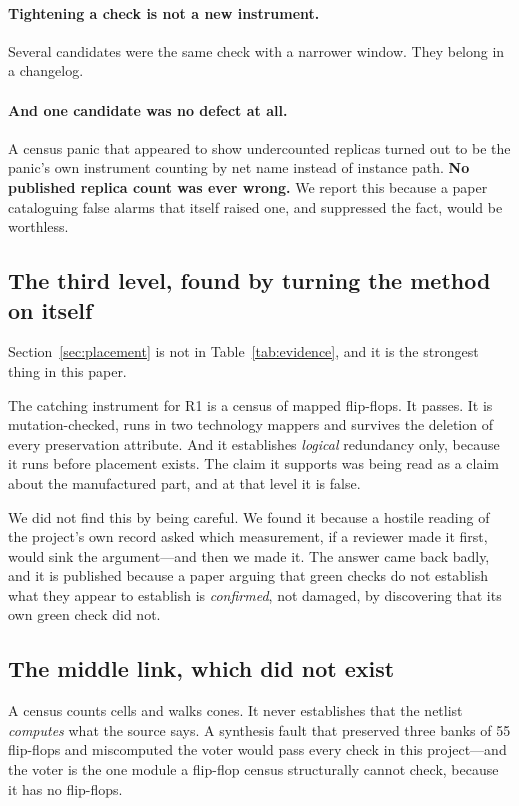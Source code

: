 \documentclass[11pt,a4paper]{article}
\begin{document}
\paragraph{Tightening a check is not a new instrument.}
Several candidates were the same check with a narrower window. They
belong in a changelog.

\paragraph{And one candidate was no defect at all.}
A census panic that appeared to show undercounted replicas turned out to
be the panic's own instrument counting by net name instead of instance
path. \textbf{No published replica count was ever wrong.} We report this
because a paper cataloguing false alarms that itself raised one, and
suppressed the fact, would be worthless.

\subsection{The third level, found by turning the method on itself}

Section~\ref{sec:placement} is not in Table~\ref{tab:evidence}, and it
is the strongest thing in this paper.

The catching instrument for R1 is a census of mapped flip-flops. It
passes. It is mutation-checked, runs in two technology mappers and
survives the deletion of every preservation attribute. And it establishes
\emph{logical} redundancy only, because it runs before placement exists.
The claim it supports was being read as a claim about the manufactured
part, and at that level it is false.

We did not find this by being careful. We found it because a hostile
reading of the project's own record asked which measurement, if a
reviewer made it first, would sink the argument---and then we made it.
The answer came back badly, and it is published because a paper arguing
that green checks do not establish what they appear to establish is
\emph{confirmed}, not damaged, by discovering that its own green check
did not.

\subsection{The middle link, which did not exist}

A census counts cells and walks cones. It never establishes that the
netlist \emph{computes} what the source says. A synthesis fault that
preserved three banks of 55 flip-flops and miscomputed the voter would
pass every check in this project---and the voter is the one module a
flip-flop census structurally cannot check, because it has no flip-flops.
\end{document}
